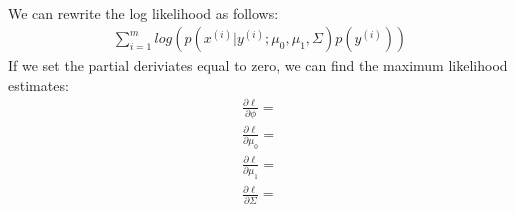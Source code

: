 \begin{answer}\\
    We can rewrite the log likelihood as follows:
    $$
    \begin{aligned}
        \sum_{i=1}^m log(p(x^{(i)} | y^{(i)}; \mu_{0}, \mu_1, \Sigma) p(y^{(i)}))
    \end{aligned}
    $$
    If we set the partial deriviates equal to zero, we can find the maximum likelihood estimates:
    $$
    \begin{aligned}
        \frac{\partial \ell}{\partial \phi} =\\
        \frac{\partial \ell}{\partial \mu_0} =\\
        \frac{\partial \ell}{\partial \mu_1} =\\
        \frac{\partial \ell}{\partial \Sigma} =\\
    \end{aligned}
    $$
\end{answer}
